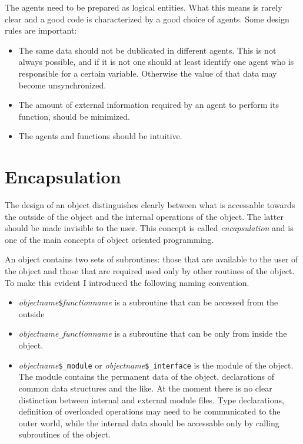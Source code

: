 \documentclass[a4paper,10pt]{report}
\begin{document}
The agents need to be prepared as logical entities. What this means is
rarely clear and a good code is characterized by a good choice of
agents. Some design rules are important: 
\begin{itemize}
\item The same data should not be dublicated in different agents. This
is not always possible, and if it is not one should at least identify
one agent who is responsible for a certain variable. Otherwise the
value of that data may become unsynchronized.
\item The amount of external information required by an agent 
to perform its function, should be minimized.
\item The agents and functions should be intuitive. 
\end{itemize}


%
\section{Encapsulation}
The  design  of  an  object  distinguishes  clearly  between  what  is
accessable  towards  the  outside  of  the  object  and  the  internal
operations of the  object. The latter should be  made invisible to the
user. This concept is called  \textit{encapsulation} and is one of the
main concepts of object oriented programming.

An object contains two sets of subroutines: those that are available
to the user of the object and those that are required used only by
other routines of the object. To make this evident I introduced the
following naming convention.
\begin{itemize}
\item \textit{objectname}\texttt{\$}\textit{functionname} is a
  subroutine that can be accessed from the outside
\item \textit{objectname}\texttt{\_}\textit{functionname} is a
  subroutine that can be only from inside the object.
\item \textit{objectname}\texttt{\$\_module} or
  \textit{objectname}\texttt{\$\_interface} is the module of the
  object. The module contains the permanent data of the object,
  declarations of common data structures and the like. At the moment
  there is no clear distinction between internal and external module
  files. Type declarations, definition of overloaded operations may
  need to be communicated to the outer world, while the internal data
  should be accessable only by calling subroutines of the object.
\end{itemize}
\end{document}
